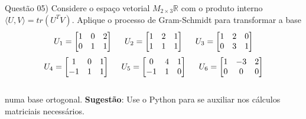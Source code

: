 
\noindent \textcolor{COLOR1}{Questão 05)} Considere o espaço vetorial $M_{2\times3}\mathbb{R}$ com o produto interno $\langle U, V\rangle= tr(U^TV)$.
Aplique o processo de Gram-Schmidt para transformar a base
\\

\[
    U_1 = \begin{bmatrix}
        1 & 0 & 2 \\
        0 & 1 & 1
    \end{bmatrix}\hspace{0.5cm}
    U_2 = \begin{bmatrix}
        1 & 2 & 1 \\
        1 & 1 & 1
    \end{bmatrix}\hspace{0.5cm}
    U_3 = \begin{bmatrix}
        1 & 2 & 0 \\
        0 & 3 & 1
    \end{bmatrix}
\]
\[
    U_4 = \begin{bmatrix}
        1  & 0 & 1 \\
        -1 & 1 & 1
    \end{bmatrix}\hspace{0.5cm}
    U_5 = \begin{bmatrix}
        0  & 4 & 1 \\
        -1 & 1 & 0
    \end{bmatrix}\hspace{0.5cm}
    U_6 = \begin{bmatrix}
        1 & -3 & 2 \\
        0 & 0  & 0
    \end{bmatrix}
\]
\\
numa base ortogonal. \textcolor{COLOR2}{\textbf{Sugestão}}: Use o Python para se auxiliar nos cálculos matriciais necessários.